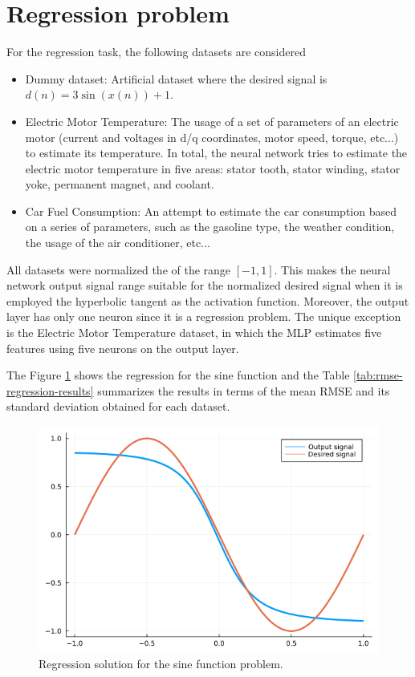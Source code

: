 \documentclass[12pt,a4paper]{article}
\begin{document}
\section*{Regression problem}

For the regression task, the following datasets are considered

\begin{itemize}
    \item Dummy dataset: Artificial dataset where the desired signal is \(d(n) = 3\sin\left( x(n) \right)+1\).
    \item Electric Motor Temperature: The usage of a set of parameters of an electric motor (current and voltages in d/q coordinates, motor speed, torque, etc...) to estimate its temperature. In total, the neural network tries to estimate the electric motor temperature in five areas: stator tooth, stator winding, stator yoke, permanent magnet, and coolant.
    \item Car Fuel Consumption: An attempt to estimate the car consumption based on a series of parameters, such as the gasoline type, the weather condition, the usage of the air conditioner, etc...
\end{itemize}

All datasets were normalized the of the range \([-1, 1]\). This makes the neural network output signal range suitable for the normalized desired signal when it is employed the hyperbolic tangent as the activation function. Moreover, the output layer has only one neuron since it is a regression problem. The unique exception is the Electric Motor Temperature dataset, in which the MLP estimates five features using five neurons on the output layer.

The Figure \ref{fig:sine-regression} shows the regression for the sine function and the Table \ref{tab:rmse-regression-results} summarizes the results in terms of the mean RMSE and its standard deviation obtained for each dataset.

\begin{figure}[H]
    \centering
    \includegraphics[scale=.4]{../trab5 (MLP)/figs/sine_regression.png}
    \caption{Regression solution for the sine function problem.}
    \label{fig:sine-regression}
\end{figure}
\end{document}
